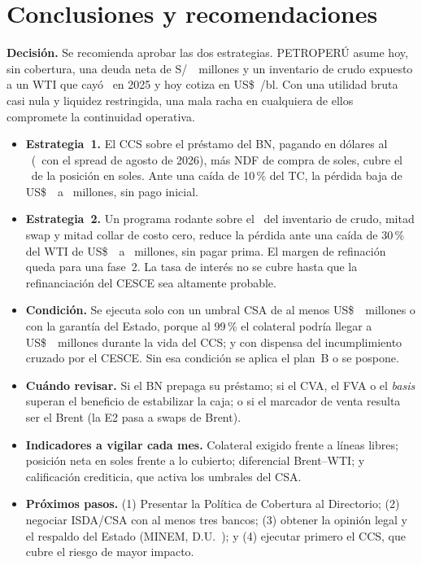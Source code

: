 \section{Conclusiones y recomendaciones}

\textbf{Decisión.} Se recomienda aprobar las dos estrategias. PETROPERÚ asume hoy, sin cobertura, una deuda neta de
S/~\PenNetoAbs\ millones y un inventario de crudo expuesto a un WTI que cayó \WTICaidaVeinticinco\ en 2025 y hoy
cotiza en US\$~\WTISpot/bl. Con una utilidad bruta casi nula y liquidez restringida, una mala racha en cualquiera de
ellos compromete la continuidad operativa.

\begin{itemize}
  \item \textbf{Estrategia~1.} El CCS sobre el préstamo del BN, pagando en dólares al \CCSTasaAllIn\
  (\CCSTasaAllInProxy\ con el spread de agosto de 2026), más NDF de compra de soles, cubre el \CoberturaFX\ de la
  posición en soles. Ante una caída de 10\,\% del TC, la pérdida baja de US\$~\EscSinCobMenosDiez\ a
  \EscConCobMenosDiez\ millones, sin pago inicial.
  \item \textbf{Estrategia~2.} Un programa rodante sobre el \CoberturaCrudoPct\ del inventario de crudo, mitad swap y
  mitad collar de costo cero, reduce la pérdida ante una caída de 30\,\% del WTI de US\$~\PerdidaSinCobTreinta\ a
  \PerdidaMaxMixto\ millones, sin pagar prima. El margen de refinación queda para una fase~2. La tasa de interés no se
  cubre hasta que la refinanciación del CESCE sea altamente probable.
  \item \textbf{Condición.} Se ejecuta solo con un umbral CSA de al menos US\$~\UmbralNecesario\ millones o con la
  garantía del Estado, porque al 99\,\% el colateral podría llegar a US\$~\PFENoventaNueve\ millones durante la
  vida del CCS; y con dispensa del incumplimiento cruzado por el CESCE. Sin esa
  condición se aplica el plan~B o se pospone.
  \item \textbf{Cuándo revisar.} Si el BN prepaga su préstamo; si el CVA, el FVA o el \emph{basis} superan el
  beneficio de estabilizar la caja; o si el marcador de venta resulta ser el Brent (la E2 pasa a swaps de Brent).
  \item \textbf{Indicadores a vigilar cada mes.} Colateral exigido frente a líneas libres; posición neta en soles
  frente a lo cubierto; diferencial Brent--WTI; y calificación crediticia, que activa los umbrales del CSA.
  \item \textbf{Próximos pasos.} (1) Presentar la Política de Cobertura al Directorio; (2) negociar ISDA/CSA con al
  menos tres bancos; (3) obtener la opinión legal y el respaldo del Estado (MINEM, D.U.~\DUCrisis); y (4) ejecutar
  primero el CCS, que cubre el riesgo de mayor impacto.
\end{itemize}
